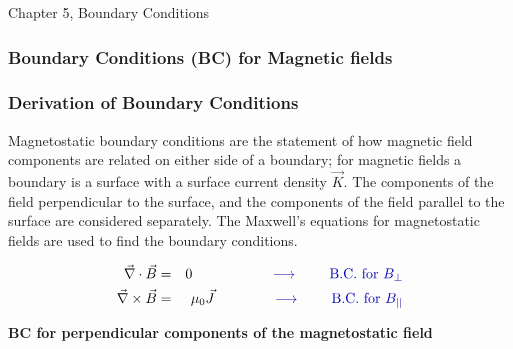 \documentclass[12pt]{article}
\begin{document}
\begin{flushright} {\color{blue} Chapter 5, Boundary Conditions} \end{flushright}
\begin{flushleft}

\subsubsection*{\bf Boundary Conditions (BC) for Magnetic fields}

\subsubsection*{\color{myblue} \bf Derivation of Boundary Conditions}

Magnetostatic boundary conditions are the statement of how magnetic field components are related on either side of a boundary; for magnetic fields a boundary is a surface with a surface current density $\vec{K}$.  The components of the field perpendicular to the surface, and the components of the field parallel to the surface are considered separately.  The Maxwell's equations for magnetostatic fields are used to find the boundary conditions.

\begin{eqnarray}
\vec{\nabla} \cdot \vec{B} & = & 0 \hspace{.8in}  {\color{myblue} \longrightarrow \hspace{.3in} \mbox{B.C. for $B_{\perp}$}} 
\label{eq:divb}\\
\vec{\nabla} \times \vec{B} &  = & \mu_{0} \vec{J} \hspace{.6in}  {\color{myblue} \longrightarrow \hspace{.3in} \mbox{B.C. for $B_{||}$}}
\label{eq:curlb}
\end{eqnarray}

\vspace{.2in}
{\bf \color{myblue} BC for perpendicular components of the magnetostatic field}


\end{flushleft}
\end{document}

